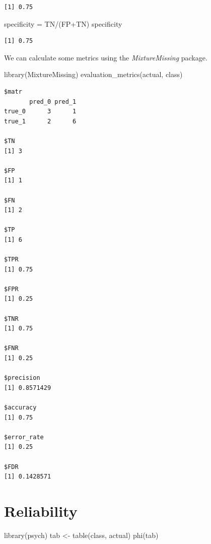 \documentclass[
  letterpaper,
  DIV=11,
  numbers=noendperiod]{scrreprt}
\newenvironment{Shaded}{\begin{snugshade}}{\end{snugshade}}
\newcommand{\FunctionTok}[1]{\textcolor[rgb]{0.28,0.35,0.67}{#1}}
\newcommand{\NormalTok}[1]{\textcolor[rgb]{0.00,0.23,0.31}{#1}}
\newcommand{\OtherTok}[1]{\textcolor[rgb]{0.00,0.23,0.31}{#1}}
\newcommand{\SpecialCharTok}[1]{\textcolor[rgb]{0.37,0.37,0.37}{#1}}
\begin{document}
\begin{verbatim}
[1] 0.75
\end{verbatim}

\begin{Shaded}
\begin{Highlighting}[]
\NormalTok{specificity }\OtherTok{=}\NormalTok{ TN}\SpecialCharTok{/}\NormalTok{(FP}\SpecialCharTok{+}\NormalTok{TN)}
\NormalTok{specificity}
\end{Highlighting}
\end{Shaded}

\begin{verbatim}
[1] 0.75
\end{verbatim}

We can calculate some metrics using the \emph{MixtureMissing} package.

\begin{Shaded}
\begin{Highlighting}[]
\FunctionTok{library}\NormalTok{(MixtureMissing)}
\FunctionTok{evaluation\_metrics}\NormalTok{(actual, class)}
\end{Highlighting}
\end{Shaded}

\begin{verbatim}
$matr
       pred_0 pred_1
true_0      3      1
true_1      2      6

$TN
[1] 3

$FP
[1] 1

$FN
[1] 2

$TP
[1] 6

$TPR
[1] 0.75

$FPR
[1] 0.25

$TNR
[1] 0.75

$FNR
[1] 0.25

$precision
[1] 0.8571429

$accuracy
[1] 0.75

$error_rate
[1] 0.25

$FDR
[1] 0.1428571
\end{verbatim}

\hypertarget{reliability}{%
\section{Reliability}\label{reliability}}

\begin{Shaded}
\begin{Highlighting}[]
\FunctionTok{library}\NormalTok{(psych)}
\NormalTok{tab }\OtherTok{\textless{}{-}} \FunctionTok{table}\NormalTok{(class, actual)}
\FunctionTok{phi}\NormalTok{(tab)}
\end{Highlighting}
\end{Shaded}
\end{document}
